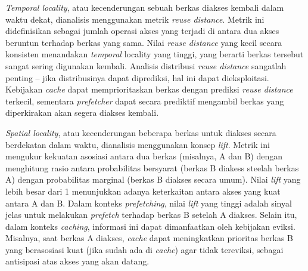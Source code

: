 \textit{Temporal locality}, atau kecenderungan sebuah berkas diakses kembali dalam waktu dekat, dianalisis menggunakan metrik \textit{reuse distance}. Metrik ini didefinisikan sebagai jumlah operasi akses yang terjadi di antara dua akses beruntun terhadap berkas yang sama. Nilai \textit{reuse distance} yang kecil secara konsisten menandakan \textit{temporal} locality yang tinggi, yang berarti berkas tersebut sangat sering digunakan kembali. Analisis distribusi \textit{reuse distance} sangatlah penting -- jika distribusinya dapat diprediksi, hal ini dapat dieksploitasi. Kebijakan \textit{cache} dapat memprioritaskan berkas dengan prediksi \textit{reuse distance} terkecil, sementara \textit{prefetcher} dapat secara prediktif mengambil berkas yang diperkirakan akan segera diakses kembali.

\textit{Spatial locality}, atau kecenderungan beberapa berkas untuk diakses secara berdekatan dalam waktu, dianalisis menggunakan konsep \textit{lift}. Metrik ini mengukur kekuatan asosiasi antara dua berkas (misalnya, A dan B) dengan menghitung rasio antara probabilitas bersyarat (berkas B diakess steelah berkas A) dengan probabilitas marginal (berkas B diakses secara umum). Nilai \textit{lift} yang lebih besar dari 1 menunjukkan adanya keterkaitan antara akses yang kuat antara A dan B. Dalam konteks \textit{prefetching}, nilai \textit{lift} yang tinggi adalah sinyal jelas untuk melakukan \textit{prefetch} terhadap berkas B setelah A diakses. Selain itu, dalam konteks \textit{caching}, informasi ini dapat dimanfaatkan oleh kebijakan eviksi. Misalnya, saat berkas A diakses, \textit{cache} dapat meningkatkan prioritas berkas B yang berasosiasi kuat (jika sudah ada di \textit{cache}) agar tidak tereviksi, sebagai antisipasi atas akses yang akan datang.
